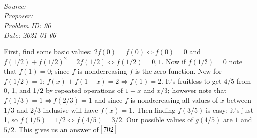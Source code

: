   
\SSbreak\\
\emph{Source: \Cop}\\
\emph{Proposer: \Paiya}\\ %
\emph{Problem ID: 90}\\
\emph{Date: 2021-01-06}\\
\SSbreak

\bigskip

\begin{solution}\hfil\medskip
	
	First, find some basic values: $2f(0) = f(0) \iff f(0) = 0$ and $f(1/2) + f(1/2)^2 = 2f(1/2) \iff f(1/2) = 0, 1$. Now if $f(1/2) = 0$ note that $f(1) = 0$; since $f$ is nondecreasing $f$ is the zero function. Now for $f(1/2) = 1$: $f(x) + f(1 - x) = 2 \iff f(1) = 2$. It's fruitless to get $4/5$ from 0, 1, and 1/2 by repeated operations of $1 - x$ and $x/3$; however note that $f(1/3) = 1 \iff f(2/3) = 1$ and since $f$ is nondecreasing all values of $x$ between 1/3 and 2/3 inclusive will have $f(x) = 1$. Then finding $f(3/5)$ is easy: it's just 1, so $f(1/5) = 1/2 \iff f(4/5) = 3/2$. Our possible values of $g(4/5)$ are $1$ and $5/2$. This gives us an answer of \(\fbox{702}\)
\end{solution}\bigskip